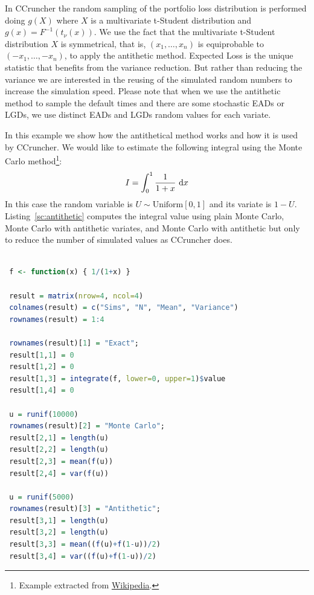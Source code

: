 \documentclass[11pt,fleqn]{book} %
\begin{document}
In CCruncher the random sampling of the portfolio loss distribution is 
performed doing $g(X)$ where $X$ is a multivariate t-Student distribution 
and $g(x) = F^{-1}(t_{\nu}(x))$. We use the fact that the multivariate 
t-Student distribution $X$ is symmetrical, that is, $(x_1,\dots,x_n)$ is 
equiprobable to $(-x_1,\dots,-x_n)$, to apply the antithetic method. 
Expected Loss is the unique statistic that benefits from the variance 
reduction. But rather than reducing the variance we are interested 
in the reusing of the simulated random numbers to increase the simulation 
speed. Please note that when we use the antithetic method to sample the 
default times and there are some stochastic EADs or LGDs, we use distinct 
EADs and LGDs random values for each variate.

\begin{example}
	In this example we show how the antithetical method works and how it 
	is used by CCruncher. We would like to estimate the following integral 
	using the Monte Carlo method\footnote{Example extracted from 
	\href{http://en.wikipedia.org/wiki/Antithetic_variates}{Wikipedia}.}:
	\begin{displaymath}
	I = \displaystyle \int_0^1 \frac{1}{1+x} \mathop{\,\mathrm{{}d}}\mathopen{} x
	\end{displaymath}
	In this case the random variable is $U \sim \text{Uniform}[0,1]$ and its variate 
	is $1-U$. Listing~\ref{sc:antithetic} computes the integral value using plain Monte 
	Carlo, Monte Carlo with antithetic variates, and Monte Carlo with antithetic but only
	to reduce the number of simulated values as CCruncher does.

	\begin{lstlisting}[language=R, label=sc:antithetic, caption=Antithetic example (R script)]

 f <- function(x) { 1/(1+x) }
 
 result = matrix(nrow=4, ncol=4)
 colnames(result) = c("Sims", "N", "Mean", "Variance")
 rownames(result) = 1:4

 rownames(result)[1] = "Exact";
 result[1,1] = 0
 result[1,2] = 0
 result[1,3] = integrate(f, lower=0, upper=1)$value
 result[1,4] = 0

 u = runif(10000)
 rownames(result)[2] = "Monte Carlo";
 result[2,1] = length(u)
 result[2,2] = length(u)
 result[2,3] = mean(f(u))
 result[2,4] = var(f(u))

 u = runif(5000)
 rownames(result)[3] = "Antithetic";
 result[3,1] = length(u)
 result[3,2] = length(u)
 result[3,3] = mean((f(u)+f(1-u))/2)
 result[3,4] = var((f(u)+f(1-u))/2)


\end{lstlisting}
\end{example}
\end{document}
